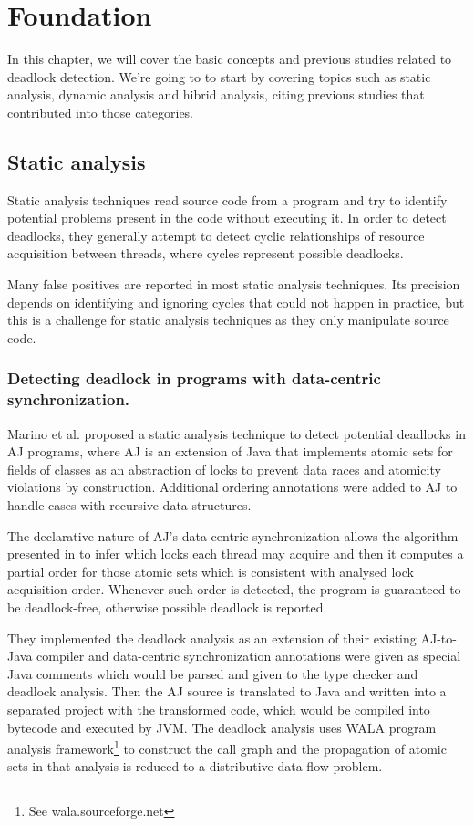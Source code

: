 \chapter{Foundation}

In this chapter, we will cover the basic concepts and previous studies related to deadlock detection. We're going to to start by covering topics such as static analysis, dynamic analysis and hibrid analysis, citing previous studies that contributed into those categories.

\section{Static analysis}

Static analysis techniques read source code from a program and try to identify potential problems present in the code without executing it.
In order to detect deadlocks, they generally attempt to detect cyclic relationships of resource acquisition between threads, where cycles represent possible deadlocks.

Many false positives are reported in most static analysis techniques. Its precision depends on identifying and ignoring cycles that could not happen in practice,
but this is a challenge for static analysis techniques as they only manipulate source code.

\subsection{Detecting deadlock in programs with data-centric synchronization.}  Marino et al. \cite{marino}
proposed a static analysis technique to detect potential deadlocks in AJ programs,
where AJ is an extension of Java that implements atomic sets for fields of classes as an abstraction of locks
to prevent data races and atomicity violations by construction. Additional ordering annotations were added to AJ to handle cases with recursive data structures.

The declarative nature of AJ's data-centric synchronization allows the algorithm presented in \cite{marino} to infer which locks each thread may acquire and
then it computes a partial order for those atomic sets which is consistent with analysed lock acquisition order.
Whenever such order is detected, the program is guaranteed to be deadlock-free, otherwise possible deadlock is reported.

They implemented the deadlock analysis as an extension of their existing AJ-to-Java compiler and data-centric synchronization annotations were given as special Java comments which
would be parsed and given to the type checker and deadlock analysis. Then the AJ source is translated to Java and written into a separated project with the transformed code,
which would be compiled into bytecode and executed by JVM. The deadlock analysis uses WALA program analysis framework\footnote{See wala.sourceforge.net} to construct the call graph and the propagation
of atomic sets in that analysis is reduced to a distributive data flow problem.

